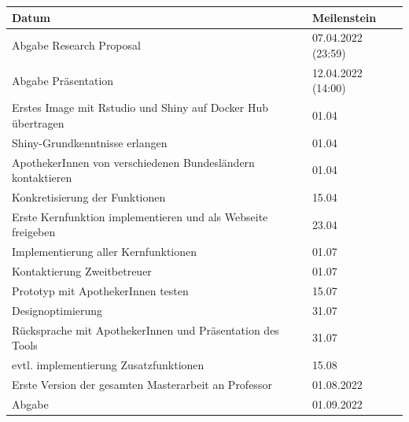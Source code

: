 \documentclass[12pt,a4paper]{article}
\begin{document}
\begin{tabular}{|l|l|}
\hline 
\rule[-1ex]{0pt}{2.5ex} \textbf{Datum} & \textbf{Meilenstein} \\ 
\hline 
\rule[-1ex]{0pt}{2.5ex} Abgabe Research Proposal  & 07.04.2022 (23:59) \\ 
\hline 
\rule[-1ex]{0pt}{2.5ex} Abgabe Präsentation & 12.04.2022 (14:00) \\ 
\hline 
\rule[-1ex]{0pt}{2.5ex} Erstes Image mit Rstudio und Shiny auf Docker Hub übertragen  & 01.04\\ 
\hline 
\rule[-1ex]{0pt}{2.5ex} Shiny-Grundkenntnisse erlangen  & 01.04 \\ 
\hline 
\rule[-1ex]{0pt}{2.5ex} ApothekerInnen von verschiedenen Bundesländern kontaktieren  & 01.04 \\ 
\hline
\rule[-1ex]{0pt}{2.5ex} Konkretisierung der Funktionen & 15.04\\ 
\hline
\rule[-1ex]{0pt}{2.5ex} Erste Kernfunktion implementieren und als Webseite freigeben & 23.04 \\ 

\hline
\rule[-1ex]{0pt}{2.5ex} Implementierung aller Kernfunktionen & 01.07\\

\hline
\rule[-1ex]{0pt}{2.5ex} Kontaktierung Zweitbetreuer & 01.07\\

\hline
\rule[-1ex]{0pt}{2.5ex} Prototyp mit ApothekerInnen testen & 15.07\\
\hline
\rule[-1ex]{0pt}{2.5ex} Designoptimierung & 31.07\\
\hline
\rule[-1ex]{0pt}{2.5ex} Rücksprache mit ApothekerInnen und Präsentation des Tools & 31.07\\
\hline

\rule[-1ex]{0pt}{2.5ex} evtl. implementierung Zusatzfunktionen & 15.08\\
\hline


\rule[-1ex]{0pt}{2.5ex} Erste Version der gesamten Masterarbeit an Professor  &  01.08.2022\\ 
\hline 
\rule[-1ex]{0pt}{2.5ex} Abgabe & 01.09.2022\\ 
\hline 
\end{tabular} 


\newpage
\printglossary[title=Glossar, toctitle=Glossar, style=altlist]
\end{document}
